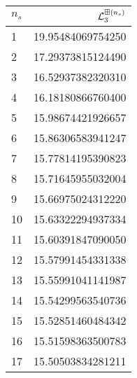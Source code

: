 \begin{tabular}[t]{lr}
\toprule
  $n_{s}$ &  $\mathcal L^{\boxplus (n_s)}_3$ \\
\midrule
        1 &                   19.95484069754250 \\
        2 &                   17.29373815124490 \\
        3 &                   16.52937382320310 \\
        4 &                   16.18180866760400 \\
        5 &                   15.98674421926657 \\
        6 &                   15.86306583941247 \\
        7 &                   15.77814195390823 \\
        8 &                   15.71645955032004 \\
        9 &                   15.66975024312220 \\
       10 &                   15.63322294937334 \\
       11 &                   15.60391847090050 \\
       12 &                   15.57991454331338 \\
       13 &                   15.55991041141987 \\
       14 &                   15.54299563540736 \\
       15 &                   15.52851460484342 \\
       16 &                   15.51598363500783 \\
       17 &                   15.50503834281211 \\
\bottomrule
\end{tabular}
